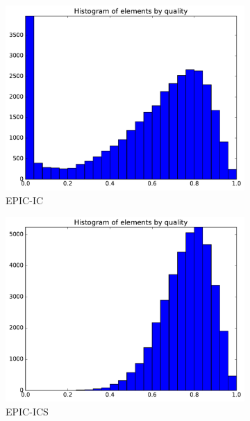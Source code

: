 \documentclass[3p,times,procedia,number]{elsarticle}
\begin{document}
\begin{figure}
\begin{subfigure}{.4\textwidth}
\centering
\includegraphics[width=\textwidth]{epic-ic-cube-cylinder-linear-quality.pdf}
\caption{EPIC-IC}
\end{subfigure}
\begin{subfigure}{.4\textwidth}
\centering
\includegraphics[width=\textwidth]{epic-ics-cube-cylinder-linear-quality.pdf}
\caption{EPIC-ICS}
\end{subfigure}
\begin{subfigure}{.4\textwidth}
\centering

\end{subfigure}
\end{figure}
\end{document}

